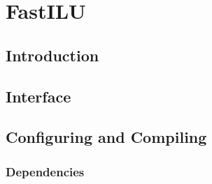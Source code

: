 
\chapter{FastILU}
\label{C:FastILU}


\section{Introduction}\label{S:FastILU:Introduction}

\section{Interface}\label{S:FastILU:Interface}

\section{Configuring and Compiling}\label{S::FastILU:Config}

\subsection{Dependencies}

